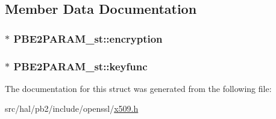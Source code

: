 \subsection{Member Data Documentation}
\subsubsection[{\texorpdfstring{encryption}{encryption}}]{$\ast$ P\+B\+E2\+P\+A\+R\+A\+M\+\_\+st\+::encryption}\hypertarget{struct_p_b_e2_p_a_r_a_m__st_a72b700e16f2dc2f87e2caa6cdce6a1c8}{}\label{struct_p_b_e2_p_a_r_a_m__st_a72b700e16f2dc2f87e2caa6cdce6a1c8}
\subsubsection[{\texorpdfstring{keyfunc}{keyfunc}}]{$\ast$ P\+B\+E2\+P\+A\+R\+A\+M\+\_\+st\+::keyfunc}\hypertarget{struct_p_b_e2_p_a_r_a_m__st_a25475b98a4fde64162ffd0b124be4a62}{}\label{struct_p_b_e2_p_a_r_a_m__st_a25475b98a4fde64162ffd0b124be4a62}


The documentation for this struct was generated from the following file\+:\begin{DoxyCompactItemize}
\item 
src/hal/pb2/include/openssl/\hyperlink{x509_8h}{x509.\+h}\end{DoxyCompactItemize}
